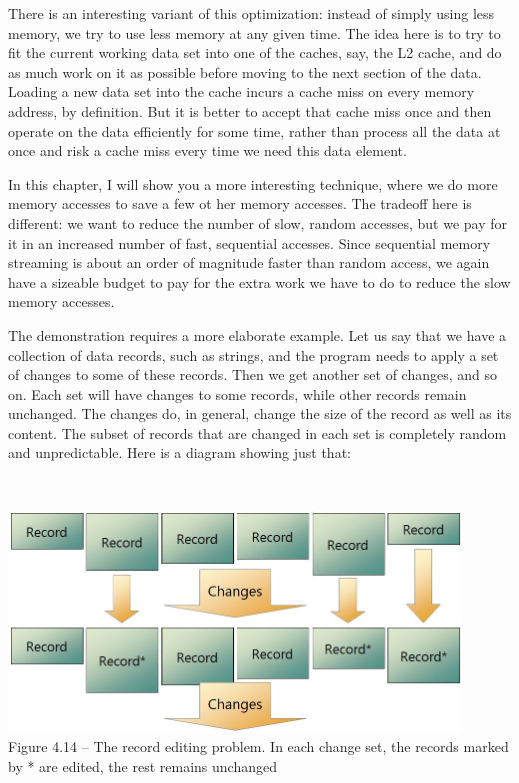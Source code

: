 There is an interesting variant of this optimization: instead of simply using less memory, we try to use less memory at any given time. The idea here is to try to fit the current working data set into one of the caches, say, the L2 cache, and do as much work on it as possible before moving to the next section of the data. Loading a new data set into the cache incurs a cache miss on every memory address, by definition. But it is better to accept that cache miss once and then operate on the data efficiently for some time, rather than process all the data at once and risk a cache miss every time we need this data element.

In this chapter, I will show you a more interesting technique, where we do more memory accesses to save a few ot her memory accesses. The tradeoff here is different: we want to reduce the number of slow, random accesses, but we pay for it in an increased number of fast, sequential accesses. Since sequential memory streaming is about an order of magnitude faster than random access, we again have a sizeable budget to pay for the extra work we have to do to reduce the slow memory accesses.

The demonstration requires a more elaborate example. Let us say that we have a collection of data records, such as strings, and the program needs to apply a set of changes to some of these records. Then we get another set of changes, and so on. Each set will have changes to some records, while other records remain unchanged. The changes do, in general, change the size of the record as well as its content. The subset of records that are changed in each set is completely random and unpredictable. Here is a diagram showing just that:

\hspace*{\fill} \\ %
\begin{center}
\includegraphics[width=0.9\textwidth]{content/1/chapter4/images/14.jpg}\\
Figure 4.14 – The record editing problem. In each change set, the records marked by * are edited, the rest remains unchanged
\end{center}

